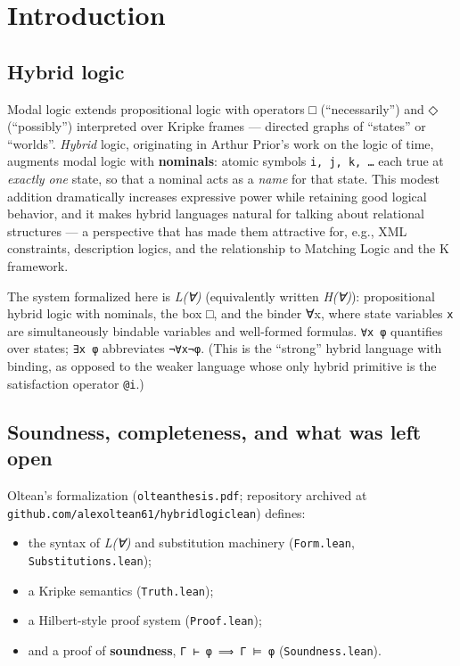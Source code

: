 \documentclass[11pt,a4paper]{article}
\renewcommand{\_}{\origtextunderscore\allowbreak}
\begin{document}
\hypertarget{introduction}{%
\section{Introduction}\label{introduction}}

\hypertarget{hybrid-logic}{%
\subsection{Hybrid logic}\label{hybrid-logic}}

Modal logic extends propositional logic with operators □ (``necessarily'') and ◇ (``possibly'') interpreted over Kripke frames --- directed graphs of ``states'' or ``worlds''. \emph{Hybrid} logic, originating in Arthur Prior's work on the logic of time, augments modal logic with \textbf{nominals}: atomic symbols \texttt{i,\ j,\ k,\ …} each true at \emph{exactly one} state, so that a nominal acts as a \emph{name} for that state. This modest addition dramatically increases expressive power while retaining good logical behavior, and it makes hybrid languages natural for talking about relational structures --- a perspective that has made them attractive for, e.g., XML constraints, description logics, and the relationship to Matching Logic and the K framework.

The system formalized here is \emph{L(∀)} (equivalently written \emph{H(∀)}): propositional hybrid logic with nominals, the box □, and the binder ∀x, where state variables \texttt{x} are simultaneously bindable variables and well-formed formulas. \texttt{∀x\ φ} quantifies over states; \texttt{∃x\ φ} abbreviates \texttt{¬∀x¬φ}. (This is the ``strong'' hybrid language with binding, as opposed to the weaker language whose only hybrid primitive is the satisfaction operator \texttt{@\_i}.)

\hypertarget{soundness-completeness-and-what-was-left-open}{%
\subsection{Soundness, completeness, and what was left open}\label{soundness-completeness-and-what-was-left-open}}

Oltean's formalization (\texttt{oltean\_thesis.pdf}; repository archived at \texttt{github.com/alexoltean61/hybrid\_logic\_lean}) defines:

\begin{itemize}
\item
  the syntax of \emph{L(∀)} and substitution machinery (\texttt{Form.lean}, \texttt{Substitutions.lean});
\item
  a Kripke semantics (\texttt{Truth.lean});
\item
  a Hilbert-style proof system (\texttt{Proof.lean});
\item
  and a proof of \textbf{soundness}, \texttt{Γ\ ⊢\ φ\ ⟹\ Γ\ ⊨\ φ} (\texttt{Soundness.lean}).
\end{itemize}
\end{document}

